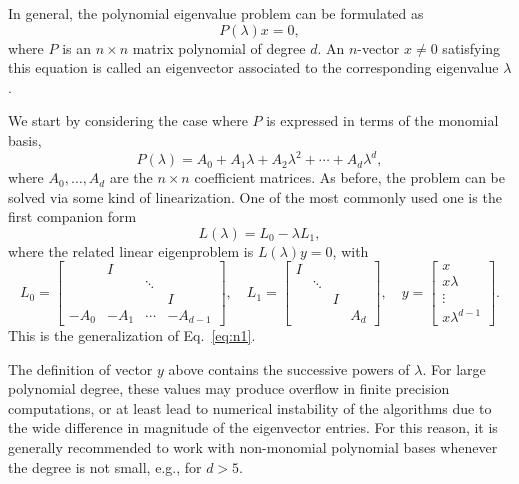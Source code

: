 In general, the polynomial eigenvalue problem can be formulated as
\begin{equation}
\label{eq:pep}
P(\lambda)x=0,
\end{equation}
where $P$ is an $n\times n$ matrix polynomial of degree $d$. An $n$-vector $x\neq 0$ satisfying this equation is called an eigenvector associated to the corresponding eigenvalue $\lambda$.

We start by considering the case where $P$ is expressed in terms of the monomial basis,
\begin{equation}
\label{eq:pepmon}
P(\lambda)=A_0+A_1 \lambda+A_2\lambda^2 +  \dotsb + A_d \lambda^d,
\end{equation}
where $A_0,\ldots,A_d$ are the $n\times n$ coefficient matrices. As before, the problem can be solved via some kind of linearization. One of the most commonly used one is the first companion form 
\begin{equation}
\label{eq:firstcomp}
L(\lambda)=L_0 -\lambda L_1,
\end{equation}
where the related linear eigenproblem is $L(\lambda)y=0$, with
\begin{equation}
\label{eq:firstcompfull}
	L_0 =
	\begin{bmatrix}
		  & I \\
		 &   & \ddots \\
		 & &    & I \\
		-A_0 & -A_1 & \cdots  & -A_{d-1}
	\end{bmatrix},
	\quad
	L_1 =
	\begin{bmatrix}
		I \\
		 & \ddots \\
		 & & I \\
		 & & & A_d
	\end{bmatrix},
        \quad y=
	\begin{bmatrix}
        x \\ x\lambda\\ \vdots \\ x\lambda^{d-1}
	\end{bmatrix}.
\end{equation}
This is the generalization of Eq.\ \ref{eq:n1}.

The definition of vector $y$ above contains the successive powers of $\lambda$. For large polynomial degree, these values may produce overflow in finite precision computations, or at least lead to numerical instability of the algorithms due to the wide difference in magnitude of the eigenvector entries. For this reason, it is generally recommended to work with non-monomial polynomial bases whenever the degree is not small, e.g., for $d>5$.

